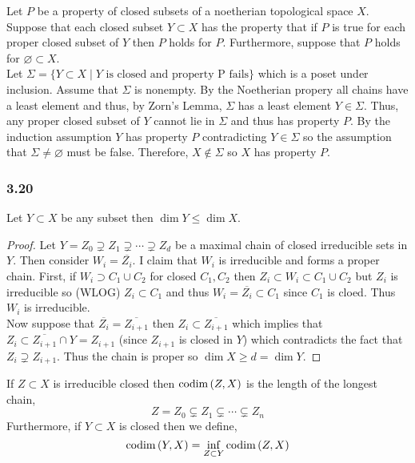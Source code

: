 \documentclass[12pt]{article}
\begin{document}
Let $P$ be a property of closed subsets of a noetherian topological space $X$. Suppose that each closed subset $Y \subset X$ has the property that if $P$ is true for each proper closed subset of $Y$ then $P$ holds for $P$. Furthermore, suppose that $P$ holds for $\varnothing \subset X$.
\bigskip\\
Let $\Sigma = \{ Y \subset X \mid Y \text{ is closed and property P fails} \}$ which is a poset under inclusion. Assume that $\Sigma$ is nonempty. By the Noetherian propery all chains have a least element and thus, by Zorn's Lemma, $\Sigma$ has a least element $Y \in \Sigma$. Thus, any proper closed subset of $Y$ cannot lie in $\Sigma$ and thus has property $P$. By the induction assumption $Y$ has property $P$ contradicting $Y \in \Sigma$ so the assumption that $\Sigma \neq \varnothing$ must be false. Therefore, $X \notin \Sigma$ so $X$ has property $P$.

\subsubsection{3.20}

\begin{lemma}
Let $Y \subset X$ be any subset then $\dim{Y} \le \dim{X}$. 
\end{lemma}

\begin{proof}
Let $Y = Z_0 \supsetneq Z_1 \supsetneq \cdots \supsetneq Z_d$ be a maximal chain of closed irreducible sets in $Y$. Then consider $W_i = \overline{Z_i}$. I claim that $W_i$ is irreducible and forms a proper chain. First, if $W_i \supset C_1 \cup C_2$ for closed $C_1, C_2$ then $Z_i \subset W_i \subset C_1 \cup C_2$ but $Z_i$ is irreducible so (WLOG) $Z_i \subset C_1$ and thus $W_i = \overline{Z_i} \subset C_1$ since $C_1$ is cloed. Thus $W_i$ is irreducible. 
\bigskip\\
Now suppose that $\overline{Z_i} = \overline{Z_{i+1}}$ then $Z_i \subset \overline{Z_{i+1}}$ which implies that $Z_i \subset \overline{Z_{i + 1}} \cap Y = Z_{i + 1}$ (since $Z_{i + 1}$ is closed in $Y$) which contradicts the fact that $Z_i \supsetneq Z_{i+1}$. Thus the chain is proper so $\dim{X} \ge d = \dim{Y}$.  
\end{proof}

\begin{definition}
If $Z \subset X$ is irreducible closed then $\mathrm{codim}\left( Z,X \right)$ is the length of the longest chain,
\[ Z = Z_0 \subsetneq Z_1 \subsetneq \cdots \subsetneq Z_n \]
Furthermore, if $Y \subset X$ is closed then we define,
\[ \mathrm{codim}\left( Y, X \right) = \inf_{Z \subset Y} \mathrm{codim}\left( Z, X \right) \]
\end{definition}
\end{document}
